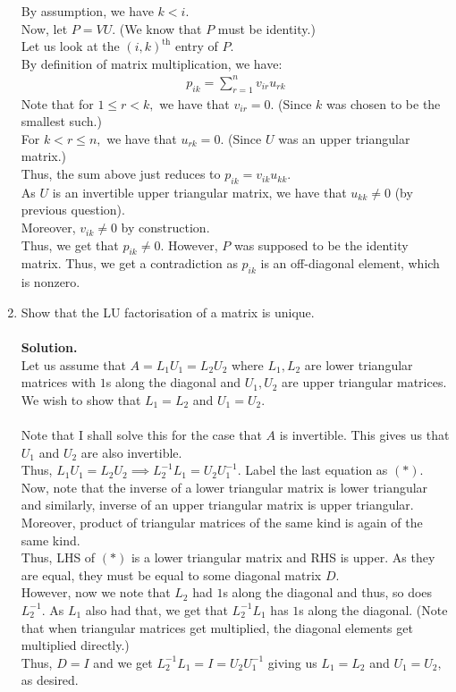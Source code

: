 \documentclass{article}
\begin{document}
\begin{enumerate}
	By assumption, we have $k < i.$\\
	Now, let $P = VU.$ (We know that $P$ must be identity.)\\
	Let us look at the $(i, k)^{\text{th}}$ entry of $P.$\\
	By definition of matrix multiplication, we have:
	\begin{align*} 
		p_{ik} = \sum_{r=1}^{n}v_{ir}u_{rk}
	\end{align*}
	Note that for $1 \le r < k,$ we have that $v_{ir} = 0.$ (Since $k$ was chosen to be the smallest such.)\\
	For $k < r \le n,$ we have that $u_{rk} = 0.$ (Since $U$ was an upper triangular matrix.)\\
	Thus, the sum above just reduces to $p_{ik} = v_{ik}u_{kk}.$\\
	As $U$ is an invertible upper triangular matrix, we have that $u_{kk} \neq 0$ (by previous question).\\
	Moreover, $v_{ik} \neq 0$ by construction.\\
	Thus, we get that $p_{ik} \neq 0.$ However, $P$ was supposed to be the identity matrix. Thus, we get a contradiction as $p_{ik}$ is an off-diagonal element, which is nonzero.
	\setcounter{enumi}{3}
	\item Show that the LU factorisation of a matrix is unique.\\~\\
	\textbf{Solution.}\\
	Let us assume that $A = L_1U_1 = L_2U_2$ where $L_1, L_2$ are lower triangular matrices with $1$s along the diagonal and $U_1, U_2$ are upper triangular matrices.\\
	We wish to show that $L_1 = L_2$ and $U_1 = U_2.$\\~\\
	Note that I shall solve this for the case that $A$ is invertible. This gives us that $U_1$ and $U_2$ are also invertible.\\
	Thus, $L_1U_1 = L_2U_2 \implies L_2^{-1}L_1 = U_2U_1^{-1}.$ Label the last equation as $(*)$.\\
	Now, note that the inverse of a lower triangular matrix is lower triangular and similarly, inverse of an upper triangular matrix is upper triangular. Moreover, product of triangular matrices of the same kind is again of the same kind.\\
	Thus, LHS of $(*)$ is a lower triangular matrix and RHS is upper. As they are equal, they must be equal to some diagonal matrix $D.$\\
	However, now we note that $L_2$ had $1$s along the diagonal and thus, so does $L_2^{-1}.$ As $L_1$ also had that, we get that $L_2^{-1}L_1$ has $1$s along the diagonal. (Note that when triangular matrices get multiplied, the diagonal elements get multiplied directly.)\\
	Thus, $D = I$ and we get $L_2^{-1}L_1 = I = U_2U_1^{-1}$ giving us $L_1 = L_2$ and $U_1 = U_2,$ as desired.
\end{enumerate}
\end{document}
